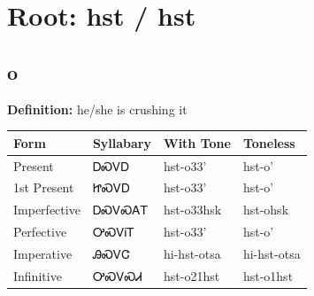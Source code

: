 \documentclass{article}%
\begin{document}
%
\normalsize%
\section*{Root: hst / hst}%
\subsection*{o}%
\textbf{Definition: }%
he/she is crushing it%
\\[0.5em]%
\begin{tabular}{|l|l|l|l|}%
\hline%
\textbf{Form}&\textbf{Syllabary}&\textbf{With Tone}&\textbf{Toneless}\\%
\hline%
Present&ᎠᏍᏙᎠ&hst{-}o33'&hst{-}o'\\%
1st Present&ᏥᏍᏙᎠ&hst{-}o33'&hst{-}o'\\%
Imperfective&ᎠᏍᏙᏍᎪᎢ&hst{-}o33hsk&hst{-}ohsk\\%
Perfective&ᎤᏍᏙᎥᎢ&hst{-}o33'&hst{-}o'\\%
Imperative&ᎯᏍᏙᏣ&hi{-}hst{-}otsa&hi{-}hst{-}otsa\\%
Infinitive&ᎤᏍᏙᏍᏗ&hst{-}o21hst&hst{-}o1hst\\%
\hline%
\end{tabular}%
\\[1em]%
\end{document}

